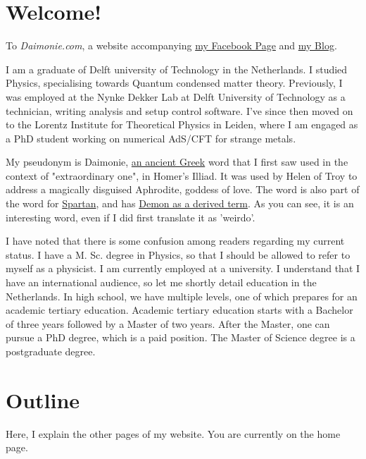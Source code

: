 

\begin{multicols}{2}

\section{Welcome!} 


To \emph{Daimonie.com}, a website accompanying \href{https://www.facebook.com/daimonie}{my Facebook Page} and \href{./blog"}{my Blog}.

I am a graduate of Delft university of Technology in the Netherlands. I studied Physics, specialising towards Quantum condensed matter theory. Previously, I was employed at the Nynke Dekker Lab at Delft University of Technology as a technician, writing analysis and setup control software. I've since then moved on to the Lorentz Institute for Theoretical Physics in Leiden, where I am engaged as a PhD student working on numerical AdS/CFT for strange metals. 

My pseudonym is Daimonie, \href{https://goo.gl/xwLXc1}{an ancient Greek} word that I first saw used in  the context of "extraordinary one", in Homer's Illiad.  It was used by Helen of Troy to address a magically disguised Aphrodite, goddess of love. The word is also part of the word for \href{https://goo.gl/kktWCr}{Spartan}, and has \href{https://goo.gl/sKxvMo}{Demon as a derived term}. As you can see, it is an interesting word, even if I did first translate it as 'weirdo'.

I have noted that there is some confusion among readers regarding my current status. I have a M. Sc. degree in Physics, so that I should be allowed to refer to myself as a physicist. I am currently employed at a university. I understand that I have an international audience, so let me shortly detail education in the Netherlands. In high school, we have multiple levels, one of which prepares for an academic tertiary education. Academic tertiary education starts with a Bachelor of three years followed by a Master of two years. After the Master, one can pursue a PhD degree, which is a paid position. The Master of Science degree is a postgraduate degree.


\section{Outline}  
Here, I explain the other pages of my website. You are currently on the home page.


\end{multicols}
